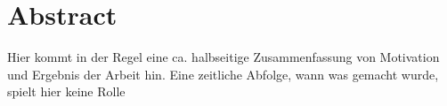 \section*{Abstract}
Hier kommt in der Regel eine ca. halbseitige Zusammenfassung von Motivation und
Ergebnis der Arbeit hin. Eine zeitliche Abfolge, wann was gemacht wurde, spielt hier
keine Rolle